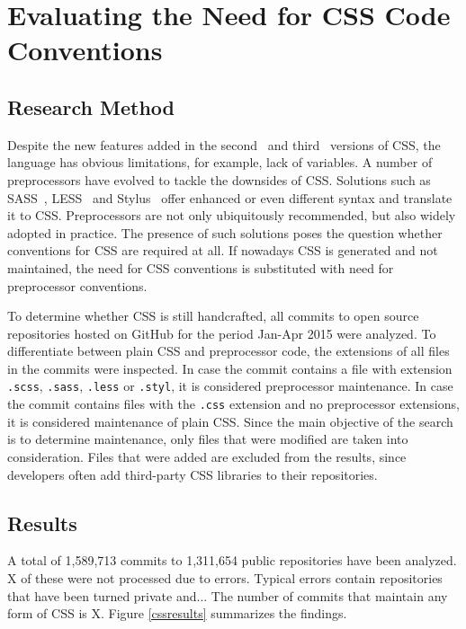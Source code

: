 \documentclass[parskip=full]{uvamscse}
\begin{document}
\chapter{Evaluating the Need for CSS Code Conventions}
\label{sec:evaluating}

\section{Research Method}

Despite the new features added in the second~\cite{CSS2} and third~\cite{CSS3} versions of CSS, the
language has obvious limitations, for example, lack of variables. A number of preprocessors have
evolved to tackle the downsides of CSS. Solutions such as SASS~\cite{SASS}, LESS~\cite{LESS} and
Stylus~\cite{Stylus} offer enhanced or even different syntax and translate it to CSS. Preprocessors
are not only ubiquitously recommended, but also widely adopted in practice. The presence of such
solutions poses the question whether conventions for CSS are required at all. If nowadays CSS is
generated and not maintained, the need for CSS conventions is substituted with need for preprocessor conventions.

To determine whether CSS is still handcrafted, all commits to open source repositories hosted on
GitHub for the period Jan-Apr 2015 were analyzed. To differentiate between plain CSS and
preprocessor code, the extensions of all files in the commits were inspected. In case the commit
contains a file with extension \texttt{.scss}, \texttt{.sass}, \texttt{.less} or \texttt{.styl}, it
is considered preprocessor maintenance. In case the commit contains files with the \texttt{.css}
extension and no preprocessor extensions, it is considered maintenance of plain CSS. Since the main
objective of the search is to determine maintenance, only files that were modified are taken into
consideration. Files that were added are excluded from the results, since developers often add
third-party CSS libraries to their repositories.


\section{Results}

A total of 1,589,713 commits to 1,311,654 public repositories have been analyzed. X of these were not processed due to errors. Typical errors contain repositories that have been turned private and... The number of commits that maintain any form of CSS is X. Figure \ref{cssresults} summarizes the findings.
\end{document}

